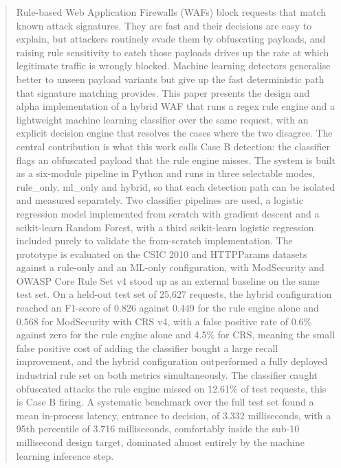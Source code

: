 \documentclass[runningheads]{llncs}
\begin{document}
\begin{abstract}
Rule-based Web Application Firewalls (WAFs) block requests that match
known attack signatures. They are fast and their decisions are easy to
explain, but attackers routinely evade them by obfuscating payloads,
and raising rule sensitivity to catch those payloads drives up the rate
at which legitimate traffic is wrongly blocked. Machine learning
detectors generalise better to unseen payload variants but give up the
fast deterministic path that signature matching provides. This paper
presents the design and alpha implementation of a hybrid WAF that runs
a regex rule engine and a lightweight machine learning classifier over
the same request, with an explicit decision engine that resolves the
cases where the two disagree. The central contribution is what this work
calls Case B detection: the classifier flags an obfuscated payload that
the rule engine misses. The system is built as a six-module pipeline in
Python and runs in three selectable modes, rule\_only, ml\_only and
hybrid, so that each detection path can be isolated and measured
separately. Two classifier pipelines are used, a logistic regression
model implemented from scratch with gradient descent and a scikit-learn
Random Forest, with a third scikit-learn logistic regression included
purely to validate the from-scratch implementation. The prototype is
evaluated on the CSIC 2010 and HTTPParams datasets against a
rule-only and an ML-only configuration, with ModSecurity and OWASP
Core Rule Set v4 stood up as an external baseline on the same test set.
On a held-out test set of 25{,}627 requests, the hybrid configuration
reached an F1-score of 0.826 against 0.449 for the rule engine alone
and 0.568 for ModSecurity with CRS v4, with a false positive rate of
0.6\% against zero for the rule engine alone and 4.5\% for CRS,
meaning the small false positive cost of adding the classifier
bought a large recall improvement, and the hybrid configuration
outperformed a fully deployed industrial rule set on both metrics
simultaneously. The classifier caught obfuscated
attacks the rule engine missed on 12.61\% of test requests, this is
Case B firing. A systematic benchmark over the full test set found a
mean in-process latency, entrance to decision, of 3.332 milliseconds,
with a 95th percentile of 3.716 milliseconds, comfortably inside the
sub-10 millisecond design target, dominated almost entirely by the
machine learning inference step.
\end{abstract}
\end{document}
